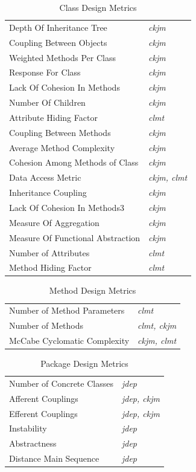 \documentclass{sig-alternate}
\begin{document}
\begin{table}
\centering
\caption{Class Design Metrics}
\label{tbl:class-selected-metrics}
\begin{tabular}{l l}
\hline
Depth Of Inheritance Tree & \textit{ckjm}\\
Coupling Between Objects & \textit{ckjm}\\
Weighted Methods Per Class & \textit{ckjm}\\
Response For Class & \textit{ckjm}\\
Lack Of Cohesion In Methods & \textit{ckjm}\\
Number Of Children & \textit{ckjm}\\
Attribute Hiding Factor & \textit{clmt}\\
Coupling Between Methods & \textit{ckjm}\\
Average Method Complexity & \textit{ckjm}\\
Cohesion Among Methods of Class & \textit{ckjm}\\
Data Access Metric & \textit{ckjm, clmt}\\
Inheritance Coupling & \textit{ckjm}\\
Lack Of Cohesion In Methods3 & \textit{ckjm}\\
Measure Of Aggregation & \textit{ckjm}\\
Measure Of Functional Abstraction & \textit{ckjm}\\
Number of Attributes & \textit{clmt}\\
Method Hiding Factor & \textit{clmt}\\
\hline
\end{tabular}
\end{table}

\begin{table}
\centering
\caption{Method Design Metrics}
\label{tbl:method-selected-metrics}
\begin{tabular}{l l}
\hline
Number of Method Parameters & \textit{clmt}\\
Number of Methods & \textit{clmt, ckjm}\\
McCabe Cyclomatic Complexity & \textit{ckjm, clmt}\\
\hline
\end{tabular}
\end{table}

\begin{table}
\centering
\caption{Package Design Metrics}
\label{tbl:package-selected-metrics}
\begin{tabular}{l l}
\hline
Number of Concrete Classes & \textit{jdep}\\
Afferent Couplings & \textit{jdep, ckjm}\\
Efferent Couplings & \textit{jdep, ckjm}\\
Instability & \textit{jdep}\\
Abstractness & \textit{jdep}\\
Distance Main Sequence & \textit{jdep}\\
\hline
\end{tabular}
\end{table}
\end{document}
